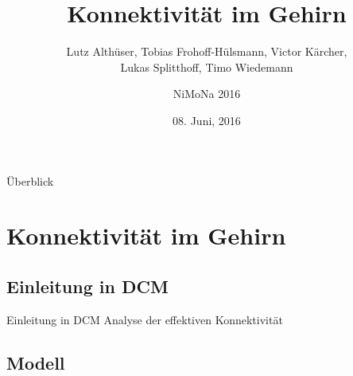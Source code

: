 \documentclass{beamer}
\author{NiMoNa 2016}
\title{Konnektivität im Gehirn}
\subtitle{Lutz Althüser, Tobias Frohoff-Hülsmann, Victor Kärcher,\\ Lukas Splitthoff, Timo Wiedemann}
\date[08.06.2016]{08. Juni, 2016}
\begin{document}
\begin{frame}[plain]
	  \maketitle
\end{frame}

\begin{frame}{Überblick}
	  \tableofcontents
\end{frame}

\section{Konnektivität im Gehirn}
\subsection{Einleitung in DCM}
	\begin{frame}{Einleitung in DCM}
		Analyse der effektiven Konnektivität
	\end{frame}
	
\subsection{Modell}
\end{document}
